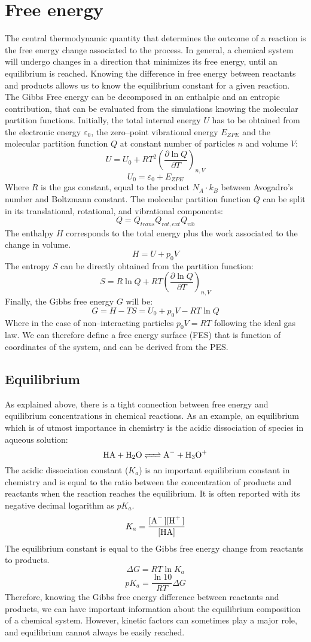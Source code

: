\section{Free energy}
The central thermodynamic quantity that determines the outcome of a reaction is the free energy change associated to the process. In general, a chemical system will undergo changes in a direction that minimizes its free energy, until an equilibrium is reached. Knowing the difference in free energy between reactants and products allows us to know the equilibrium constant for a given reaction. The Gibbs Free energy can be decomposed in an enthalpic and an entropic contribution, that can be evaluated from the simulations knowing the molecular partition functions. Initially, the total internal energy $U$ has to be obtained from the electronic energy $\varepsilon_0$, the zero--point vibrational energy $E_{ZPE}$ and the molecular partition function $Q$ at constant number of particles $n$ and volume $V$:
\[
U = U_{0} + R T^{2}\left(\frac{\partial \ln Q}{\partial T}\right)_{n,V}
\]
\[ U_{0} = \varepsilon_{0} + E_{ZPE} \]
Where $R$ is the gas constant, equal to the product $N_{A}\cdot k_{B}$ between Avogadro's number and Boltzmann constant. The molecular partition function $Q$ can be split in its translational, rotational, and vibrational components:
\[
Q = Q_{trans}Q_{rot, ext}Q_{vib}
\]
The enthalpy $H$ corresponds to the total energy plus the work associated to the change in volume.
\[
H = U + p_{0}V
\] 
The entropy $S$ can be directly obtained from the partition function:
\[
S = R \ln Q + RT \left(\frac{\partial \ln Q}{\partial
T}\right)_{n,V}
\]
Finally, the Gibbs free energy $G$ will be:
\[
G = H - TS = U_{0} + p_{0}V - RT\ln Q
\]
Where in the case of non--interacting particles $p_{0}V = RT$ following the ideal gas law. We can therefore define a free energy surface (FES) that is function of coordinates of the system, and can be derived from the PES.

\subsection*{Equilibrium}
As explained above, there is a tight connection between free energy and equilibrium concentrations in chemical reactions. As an example, an equilibrium which is of utmost importance in chemistry is the acidic dissociation of species in aqueous solution:
\[
\ce{HA + H2O <=> A- + H3O+}
\]
The acidic dissociation constant ($K_a$) is an important equilibrium constant in chemistry and is equal to the ratio between the concentration of products and reactants when the reaction reaches the equilibrium. It is often reported with its negative decimal logarithm as $pK_a$.
\[
K_a=\dfrac{\ce{[A- ][H+ ]}}{\ce{[HA]}} 
\]
The equilibrium constant is equal to the Gibbs free energy change from reactants to products.
\[
\Delta G = RT \ln K_a
\]
\[
pK_a = \dfrac{\ln 10}{RT} \Delta G
\]
Therefore, knowing the Gibbs free energy difference between reactants and products, we can have important information about the equilibrium composition of a chemical system. However, kinetic factors can sometimes play a major role, and equilibrium cannot always be easily reached.

